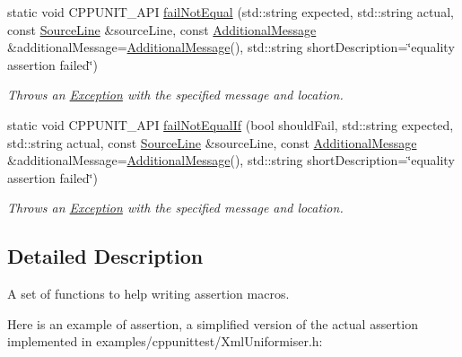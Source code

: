 \begin{DoxyCompactItemize}
\item 
static void C\-P\-P\-U\-N\-I\-T\-\_\-\-A\-P\-I \hyperlink{struct_asserter_ac6234767e7d986bace97dc44f8d80d6c}{fail\-Not\-Equal} (std\-::string expected, std\-::string actual, const \hyperlink{class_source_line}{Source\-Line} \&source\-Line, const \hyperlink{class_additional_message}{Additional\-Message} \&additional\-Message=\hyperlink{class_additional_message}{Additional\-Message}(), std\-::string short\-Description=\char`\"{}equality assertion failed\char`\"{})
\begin{DoxyCompactList}\small\item\em Throws an \hyperlink{class_exception}{Exception} with the specified message and location. \end{DoxyCompactList}\item 
static void C\-P\-P\-U\-N\-I\-T\-\_\-\-A\-P\-I \hyperlink{struct_asserter_a3a805c9f8c641d65353bcff2da80624f}{fail\-Not\-Equal\-If} (bool should\-Fail, std\-::string expected, std\-::string actual, const \hyperlink{class_source_line}{Source\-Line} \&source\-Line, const \hyperlink{class_additional_message}{Additional\-Message} \&additional\-Message=\hyperlink{class_additional_message}{Additional\-Message}(), std\-::string short\-Description=\char`\"{}equality assertion failed\char`\"{})
\begin{DoxyCompactList}\small\item\em Throws an \hyperlink{class_exception}{Exception} with the specified message and location. \end{DoxyCompactList}\end{DoxyCompactItemize}


\subsection{Detailed Description}
A set of functions to help writing assertion macros.

Here is an example of assertion, a simplified version of the actual assertion implemented in examples/cppunittest/\-Xml\-Uniformiser.\-h\-: 


